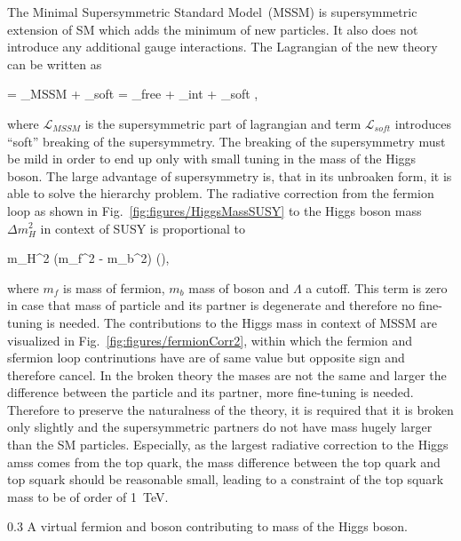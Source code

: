 The Minimal Supersymmetric Standard Model~(MSSM) is supersymmetric extension of SM which adds the minimum of new particles. It also does not introduce any additional gauge interactions. The Lagrangian of the new theory can be written as

{
     =  _{MSSM} +  _{soft} = _{free} + _{int} + _{soft}    ,
}

where $\mathcal{L}_{MSSM}$ is the supersymmetric part of lagrangian and term $\mathcal{L}_{soft}$ introduces ``soft'' breaking of the supersymmetry. The breaking of the supersymmetry must be mild in order to end up only with small tuning in the mass of the Higgs boson. The large advantage of supersymmetry is, that in its unbroaken form, it is able to solve the hierarchy problem. The radiative correction from the fermion loop as shown in Fig.~\ref{fig:figures/HiggsMassSUSY} to the Higgs boson mass $\Delta m_{H}^{2}$ in context of SUSY is proportional to

{
\Delta m_{H}^{2} \propto (m_{f}^{2} - m_{b}^2) (),
}

where $m_{f}$ is mass of fermion, $m_{b}$ mass of boson and $\Lambda$ a cutoff. This term is zero in case that mass of particle and its partner is degenerate and therefore no fine-tuning is needed. The contributions to the Higgs mass in context of MSSM are visualized in Fig.~\ref{fig:figures/fermionCorr2}, within which the fermion and sfermion loop contrinutions have are of same value but opposite sign and therefore cancel. In the broken theory the mases are not the same and larger the difference between the particle and its partner, more fine-tuning is needed. Therefore to preserve the naturalness of the theory, it is required that it is broken only slightly and the supersymmetric partners do not have mass hugely larger than the SM particles. Especially, as the largest radiative correction to the Higgs amss comes from the top quark, the mass difference between the top quark and top squark should be reasonable small, leading to a constraint of the top squark mass to be of order of 1~TeV.  

                 {0.3}       %
                 { A virtual fermion and boson contributing to mass of the Higgs boson.}

